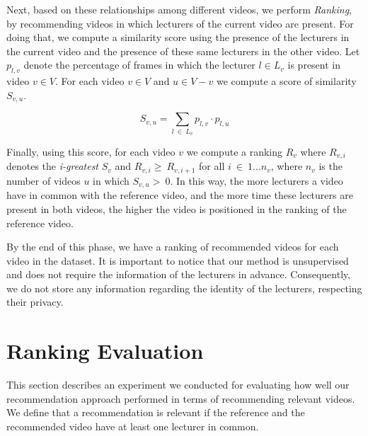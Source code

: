 Next, based on these relationships among different videos, we perform \textit{Ranking}, by recommending videos in which lecturers of the current video are present. 
For doing that, we compute a similarity score using the presence of the lecturers in the current video and the presence of these same lecturers in the other video.
Let $p_{l,v}$ denote the percentage of frames in which the lecturer $l \in L_v$ is present in video $v \in V$. For each video $v \in V$ and $u \in V-v$ we compute a score of similarity $S_{v,u}$.

\begin{equation}
  S_{v,u} = \sum_{l~\in~L_v}{p_{l,v}\cdot{p_{l,u}}}
\end{equation}

Finally, using this score, for each video $v$ we compute a ranking $R_{v}$ where $R_{v,i}$ denotes the \emph{i-greatest} $S_v$ and $R_{v,i}\ge~R_{v,i+1}$ for all $i~\in~1...n_v$, where $n_v$ is the number of videos $u$ in which $S_{v,u}>~0$. 
In this way, the more lecturers a video have in common with the reference video, and the more time these lecturers are present in both videos, the higher the video is positioned in the ranking of the reference video.  

By the end of this phase, we have a ranking of recommended videos for each video in the dataset.
It is important to notice that our method is unsupervised and does not require the information of the lecturers in advance.
Consequently, we do not store any information regarding the identity of the lecturers, respecting their privacy.


\section{Ranking Evaluation}
\label{sec:recommendation_ranking_evaluarion}

This section describes an experiment we conducted for evaluating how well our recommendation approach performed in terms of recommending relevant videos. We define that a recommendation is relevant if the reference and the recommended video have at least one lecturer in common.

